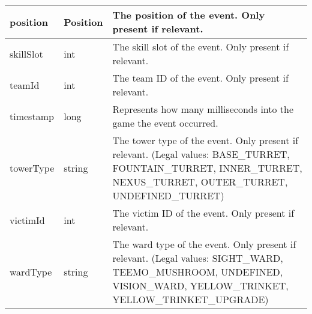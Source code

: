 \begin{table}[!h]
\begin{tabular}{llp{5cm}}
position                & Position           & The position of the event. Only present if relevant.                                                                                                                                                                                        \\ \hline
skillSlot               & int                & The skill slot of the event. Only present if relevant.                                                                                                                                                                                      \\ \hline
teamId                  & int                & The team ID of the event. Only present if relevant.                                                                                                                                                                                         \\ \hline
timestamp               & long               & Represents how many milliseconds into the game the event occurred.                                                                                                                                                                          \\ \hline
towerType               & string             & The tower type of the event. Only present if relevant. (Legal values: BASE\_TURRET, FOUNTAIN\_TURRET, INNER\_TURRET, NEXUS\_TURRET, OUTER\_TURRET, UNDEFINED\_TURRET)                                                                       \\ \hline
victimId                & int                & The victim ID of the event. Only present if relevant.                                                                                                                                                                                       \\ \hline
wardType                & string             & The ward type of the event. Only present if relevant. (Legal values: SIGHT\_WARD, TEEMO\_MUSHROOM, UNDEFINED, VISION\_WARD, YELLOW\_TRINKET, YELLOW\_TRINKET\_UPGRADE)                                                                      \\ \hline
\end{tabular}
\end{table}


\FloatBarrier
